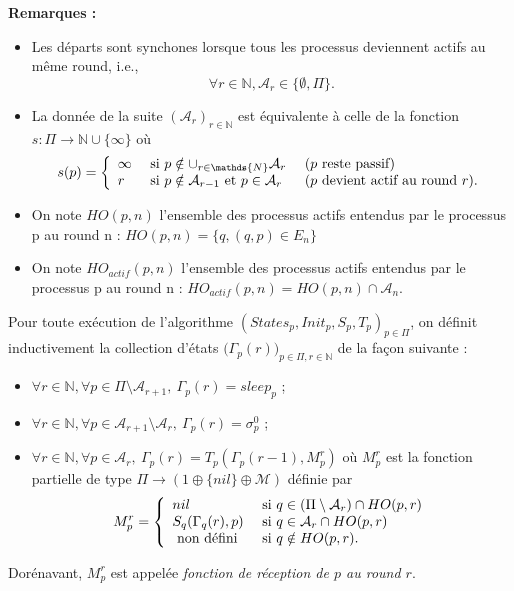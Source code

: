 \documentclass{article}
\begin{document}
\textbf{Remarques :}
\begin{itemize}
	\item Les départs sont synchones lorsque tous les processus deviennent actifs au même round, i.e.,
	$$ \forall r \in \mathds{N}, \mathcal{A}_r \in \{\emptyset, \Pi\}  . $$
	\item La donn\'ee de la suite $(\mathcal{A}_r)_{r \in \mathds{N}}$ est  équivalente \`a celle de la fonction 
	$s : \Pi \rightarrow \mathds{N} \cup \{\infty\}$ où 
	$$ s(p) = \left \{ \begin{array}{l ll}
	                          \infty & \mbox{ si  } p \notin \cup_{r \in \mathds{N}}  \mathcal{A}_r &  \mbox { ($p$ reste passif) } \\
	                          r  & \mbox{ si  } p \notin \mathcal{A}_{r-1} \mbox{ et } p \in \mathcal{A}_{r}  & \mbox{ ($p$ devient actif au round $r$)}.
	                          \end{array} \right.$$ 
	\item On note $HO(p,n)$ l'ensemble des processus actifs entendus par le processus p au round n : $HO(p,n) = \{q, (q,p) \in E_n\}$
	\item On note $HO_{actif}(p,n)$ l'ensemble des processus actifs entendus par le processus p au round n : $HO_{actif}(p,n) = HO(p,n) \cap \mathcal{A}_n$.

\end{itemize}

Pour toute  exécution de l'algorithme  $(States_p, Init_p, S_p,T_p)_{p\in \Pi}$, on définit inductivement la collection 
	d'\'etats $ \big( \Gamma_p(r) \big )_{p\in\Pi, r\in \mathds{N}}$ de la fa\c{c}on suivante : 
	\begin{itemize}
		\item $\forall r \in \mathds{N},\forall p \in \Pi \setminus \mathcal{A}_{r+1}, \  \Gamma_p(r) = sleep_p$ ;
		\item $\forall r  \in \mathds{N},\forall p \in \mathcal{A}_{r+1} \setminus \mathcal{A}_r, \ \Gamma_p(r) = \sigma^0_p$ ;
		\item $\forall r  \in \mathds{N},\forall p \in \mathcal{A}_{r} , \  \Gamma_p(r) = T_p (\Gamma_p(r - 1) ,M_p^{r})$
			où $M_p^r$ est la fonction partielle de type $\Pi \rightarrow (1 \oplus \{ nil \} \oplus \mathcal{M})$ définie par 
			$$ M_p^r = \left \{ \begin{array}{l l}
	                         nil  & \mbox{ si  } q \in (\Pi \setminus \mathcal{A}_r  ) \cap  HO(p,r)  \\
	                         S_q (\Gamma_q(r), p)  & \mbox{ si  }   q \in \mathcal{A}_r  \cap  HO(p,r) \\
	                         \mbox{ non d\'efini  } & \mbox{ si  }   q \notin  HO(p,r) .
	                          \end{array} \right.$$ 
	\end{itemize}
Dorénavant, $M_p^r$ est appelée \emph{fonction de réception de $p$ au round $r$}.
\end{document}
